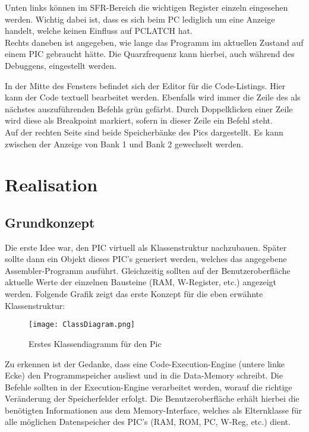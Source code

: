 \documentclass[
10pt, %
a4paper, %
oneside, %
headinclude,footinclude, %
BCOR5mm, %
]{scrartcl}
\begin{document}
	Unten links können im SFR-Bereich die wichtigen Register einzeln eingesehen werden. Wichtig dabei ist, dass es sich beim PC lediglich um eine Anzeige handelt, welche keinen Einfluss auf PCLATCH hat. \\Rechts daneben ist angegeben, wie lange das Programm im aktuellen Zustand auf einem PIC gebraucht hätte. Die Quarzfrequenz kann hierbei, auch während des Debuggens, eingestellt werden. 
	
	In der Mitte des Fensters befindet sich der Editor für die Code-Listings. Hier kann der Code textuell bearbeitet werden. Ebenfalls wird immer die Zeile des als nächstes auszuführenden Befehls grün gefärbt. Durch Doppelklicken einer Zeile wird diese als Breakpoint markiert, sofern in dieser Zeile ein Befehl steht. \\
	Auf der rechten Seite sind beide Speicherbänke des Pics dargestellt. Es kann zwischen der Anzeige von Bank 1 und Bank 2 gewechselt werden. 

\section{Realisation}
	\subsection{Grundkonzept}
		Die erste Idee war, den PIC virtuell als Klassenstruktur nachzubauen. Später sollte dann ein Objekt dieses PIC's generiert werden, welches das angegebene Assembler-Programm ausführt. Gleichzeitig sollten auf der Benutzeroberfläche aktuelle Werte der einzelnen Bausteine (RAM, W-Register, etc.) angezeigt werden. Folgende Grafik zeigt das erste Konzept für die eben erwähnte Klassenstruktur:
		\vspace{1cm}
		
		\begin{figure}[h]
			\begin{center}
				\texttt{[image: ClassDiagram.png]}
				\caption{Erstes Klassendiagramm für den Pic}
			\end{center}
		\end{figure}
	
		Zu erkennen ist der Gedanke, dass eine Code-Execution-Engine (untere linke Ecke) den Programmspeicher ausliest und in die Data-Memory schreibt. Die Befehle sollten in der Execution-Engine verarbeitet werden, worauf die richtige Veränderung der Speicherfelder erfolgt. Die Benutzeroberfläche erhält hierbei die benötigten Informationen aus dem Memory-Interface, welches als Elternklasse für alle möglichen Datenspeicher des PIC's (RAM, ROM, PC, W-Reg, etc.) dient.
		
\end{document}
